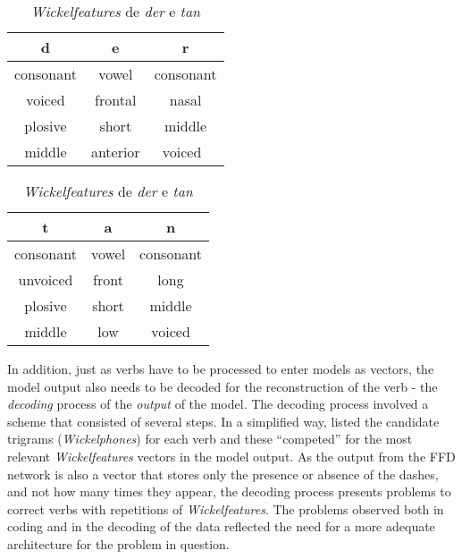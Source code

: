 \begin{table}[H]
    \begin{minipage}{.5\linewidth}
      \centering
      \caption{}
        \begin{tabular}{ccc}
        d                    & e                    & r                    \\ \hline
        consonant            & vowel                & consonant            \\
        voiced              & frontal              & nasal             \\
        plosive                 & short                & middle                \\
        middle               & anterior                  & voiced\
        \end{tabular}
        \label{tab:der}
    \end{minipage}%
    \begin{minipage}{.5\linewidth}
      \centering
        \caption{}

    \begin{tabular}{ccc}
    t                    & a                    & n                    \\ \hline
    consonant            & vowel                & consonant            \\
    unvoiced                & front              & long              \\
    plosive                 & short                & middle                \\
    middle                & low                  & voiced             \\

    \end{tabular}
    \label{tab:tan}
    \end{minipage} 
\caption{\textit{Wickelfeatures} de \textit{der} e \textit{tan}}
\label{tab:wickeldertan}
\end{table}

In addition, just as verbs have to be processed to enter models as vectors, the model output also needs to be decoded for the reconstruction of the verb - the \textit{decoding} process of the \textit{output} of the model. The decoding process involved a scheme that consisted of several steps. In a simplified way, \cite {rumelhart:1986} listed the candidate trigrams (\textit{Wickelphones}) for each verb and these “competed” for the most relevant \textit{Wickelfeatures} vectors in the model output. As the output from the FFD network is also a vector that stores only the presence or absence of the dashes, and not how many times they appear, the decoding process presents problems to correct verbs with repetitions of \textit{Wickelfeatures}. The problems observed both in coding and in the decoding of the data reflected the need for a more adequate architecture for the problem in question.

